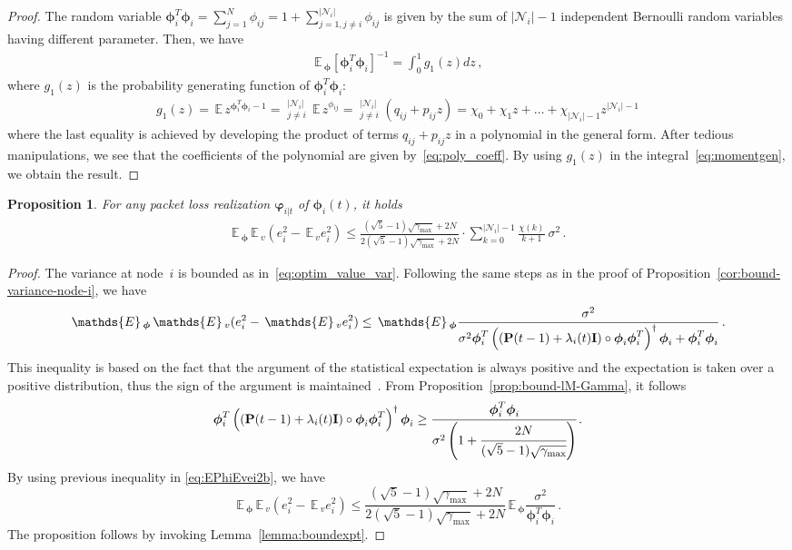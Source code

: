 \documentclass[a4paper,notitlepage,onecolumn]{article}
\def\P{\mathds{P}}
\def\I{{\cal I}}
\def\I{{\bf I}}
\def\P{{\bf P}}
\def\phib{\boldsymbol{\phi}}
\def\varphib{\boldsymbol{\varphi}}
\def\E{\,\mathds{E}\,}
\newtheorem{proposition}[theorem]{Proposition}
\numberwithin{equation}{section}
\begin{document}
\begin{proof}
The random variable $\phib_i^T\phib_i=\sum_{j=1}^{N}\phi_{ij} = 1+
\sum_{j=1, j\neq i}^{|\mathcal{N}_{i}|}\phi_{ij} $ is given by the
sum of $|\mathcal{N}_{i}|-1$ independent Bernoulli random
variables having different parameter. Then, we have~\cite{Chao72}
\begin{align} \label{eq:momentgen}
    \E_{\phib} \left[\phib_i^T\phib_i\right]^{-1} = \int_0^1 g_1(z) dz \,,
\end{align}
where $g_1(z)$ is the probability generating function of $\phib_i^T \phib_i$:
\begin{align*}
    g_1(z)= \E z^{\phib_i^T \phib_i - 1} = \mathop{\prod_{j=1}}_{j\neq i}^{|\mathcal{N}_{i}|} \E z^{\phi_{ij}} =
     \mathop{\prod_{j=1}}_{j\neq i}^{|\mathcal{N}_{i}|} (q_{ij}+p_{ij}z) = \chi_0 + \chi_1 z + \dots + \chi_{|\mathcal{N}_{i}|-1} z^{|\mathcal{N}_{i}|-1}
\end{align*}
where the last equality is achieved by developing the product of
terms $q_{ij}+p_{ij}z$ in a polynomial in the general form. After
tedious manipulations, we see that the coefficients of the
polynomial are given by~\eqref{eq:poly_coeff}.
By using $g_1(z)$ in the integral~\eqref{eq:momentgen}, we obtain
the result.
\end{proof}
\begin{proposition}
For any packet loss realization $\varphib_{i|t}$ of $\phib_i(t)$,
it holds
\begin{align} \label{eq:expected_value_var-slightly-bounded}
        \E_{\phib} \E_v (e_i^2-\E_v e_i^2)\leq \frac{(\sqrt{5}-1)\sqrt{\gamma_{\max}}+2N}{2(\sqrt{5}-1)\sqrt{\gamma_{\max}}
        +2N}\cdot \sum_{k = 0}^{|\mathcal{N}_{i}|-1} \frac{\chi(k)}{k+1}\: \sigma^2\,.
    \end{align}
\end{proposition}
\begin{proof}
    The variance at node~$i$ is bounded as in~\eqref{eq:optim_value_var}. Following the same steps as in the proof of
    Proposition~\ref{cor:bound-variance-node-i}, we have
    \begin{align} \label{eq:EPhiEvei2b}
        \E_{\phib} \E_v (e_i^2-\E_v e_i^2) \leq \E_{\phib} \frac{\sigma^2}{\sigma^2\phib_i^T \left((\P(t-1)+\lambda_i(t) \I) \circ \phib_i\phib_i^T\right)^\dag\phib_i + \phib_i^T \phib_i }\,.
    \end{align}
    This inequality is based on the fact that the argument of the statistical expectation is always positive and the expectation is taken over a positive distribution, thus the sign of the argument is maintained~\cite[pag.392]{Horn85}.
    From Proposition~\ref{prop:bound-lM-Gamma}, it
    follows
    $$
        \phib_i^T \left((\P(t-1)+\lambda_i(t) \I) \circ \phib_i\phib_i^T\right)^\dag\phib_i \geq
        \cfrac{\phib_i^T\phib_i}{\sigma^2 \left(1+\cfrac{2N}{(\sqrt{5}-1)\sqrt{\gamma_{\max}}}\right)} \,.
    $$
    By using previous inequality in \eqref{eq:EPhiEvei2b}, we have
    $$
        \E_{\phib} \E_v (e_i^2-\E_v e_i^2) \leq \frac{(\sqrt{5}-1)\sqrt{\gamma_{\max}}+2N}{2(\sqrt{5}-1)\sqrt{\gamma_{\max}}+2N}  \E_{\phib}
        \frac{\sigma^2}{\phib_i^T\phib_i}\,.
    $$
    The proposition follows by invoking Lemma~\ref{lemma:boundexpt}.
\end{proof}
\end{document}
